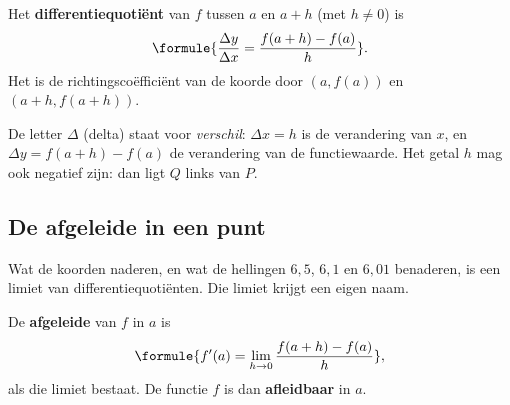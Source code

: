 \begin{theorie}
Het \textbf{\textcolor{accent}{differentiequotiënt}} van $f$ tussen $a$ en $a + h$ (met $h \neq 0$) is
\[\formule{\frac{\Delta y}{\Delta x} = \frac{f(a + h) - f(a)}{h}}.\]
Het is de richtingscoëfficiënt van de koorde door $(a, f(a))$ en $(a + h, f(a + h))$.
\end{theorie}

De letter $\Delta$ (delta) staat voor \textit{verschil}: $\Delta x = h$ is de verandering van $x$, en $\Delta y = f(a + h) - f(a)$ de verandering van de functiewaarde. Het getal $h$ mag ook negatief zijn: dan ligt $Q$ links van $P$.


\begin{oefeningen}
\end{oefeningen}

\subsection{De afgeleide in een punt}

Wat de koorden naderen, en wat de hellingen $6{,}5$, $6{,}1$ en $6{,}01$ benaderen, is een limiet van differentiequotiënten. Die limiet krijgt een eigen naam.

\begin{theorie}
De \textbf{\textcolor{accent}{afgeleide}} van $f$ in $a$ is
\[\formule{f'(a) = \lim_{h \to 0} \frac{f(a + h) - f(a)}{h}},\]
als die limiet bestaat. De functie $f$ is dan \textbf{\textcolor{accent}{afleidbaar}} in $a$.
\end{theorie}

